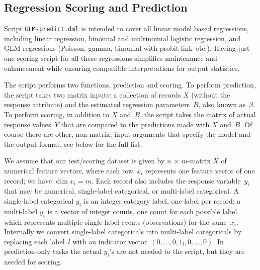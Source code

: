 \subsection{Regression Scoring and Prediction}

\smallskip

Script {\tt GLM-predict.dml} is intended to cover all linear model based regressions,
including linear regression, binomial and multinomial logistic regression, and GLM
regressions (Poisson, gamma, binomial with probit link~etc.).  Having just one scoring
script for all these regressions simplifies maintenance and enhancement while ensuring
compatible interpretations for output statistics.

The script performs two functions, prediction and scoring.  To perform prediction,
the script takes two matrix inputs: a collection of records $X$ (without the response
attribute) and the estimated regression parameters~$B$, also known as~$\beta$.  
To perform scoring, in addition to $X$ and~$B$, the script takes the matrix of actual
response values~$Y$ that are compared to the predictions made with $X$ and~$B$.  Of course
there are other, non-matrix, input arguments that specify the model and the output
format, see below for the full list.

We assume that our test/scoring dataset is given by $n\,{\times}\,m$-matrix $X$ of
numerical feature vectors, where each row~$x_i$ represents one feature vector of one
record; we have \mbox{$\dim x_i = m$}.  Each record also includes the response
variable~$y_i$ that may be numerical, single-label categorical, or multi-label categorical.
A single-label categorical $y_i$ is an integer category label, one label per record;
a multi-label $y_i$ is a vector of integer counts, one count for each possible label,
which represents multiple single-label events (observations) for the same~$x_i$.  Internally
we convert single-label categoricals into multi-label categoricals by replacing each
label~$l$ with an indicator vector~$(0,\ldots,0,1_l,0,\ldots,0)$.  In prediction-only
tasks the actual $y_i$'s are not needed to the script, but they are needed for scoring.

